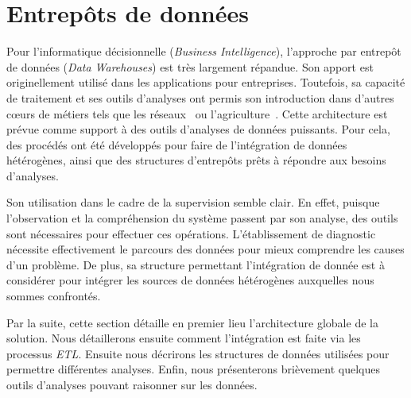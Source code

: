 \section{Entrepôts de données}\label{sec:rw:supervision:warehouse}
Pour l'informatique décisionnelle (\textit{Business Intelligence}), l'approche par entrepôt de données (\textit{Data Warehouses}) est très largement répandue. Son apport est originellement utilisé dans les applications pour entreprises. Toutefois, sa capacité de traitement et ses outils d'analyses ont permis son introduction dans d'autres cœurs de métiers tels que les réseaux~\cite{Gilbert:quicksand} ou l'agriculture~\cite{Abdullah:olap}. Cette architecture est prévue comme support à des outils d'analyses de données puissants. Pour cela, des procédés ont été développés pour faire de l'intégration de données hétérogènes, ainsi que des structures d'entrepôts prêts à répondre aux besoins d'analyses.

Son utilisation dans le cadre de la supervision semble clair. En effet, puisque l'observation et la compréhension du système passent par son analyse, des outils sont nécessaires pour effectuer ces opérations. L'établissement de diagnostic nécessite effectivement le parcours des données pour mieux comprendre les causes d'un problème. De plus, sa structure permettant l'intégration de donnée est à considérer pour intégrer les sources de données hétérogènes auxquelles nous sommes confrontés.

Par la suite, cette section détaille en premier lieu l'architecture globale de la solution. Nous détaillerons ensuite comment l'intégration est faite via les processus \textit{ETL}. Ensuite nous décrirons les structures de données utilisées pour permettre différentes analyses. Enfin, nous présenterons brièvement quelques outils d'analyses pouvant raisonner sur les données.

